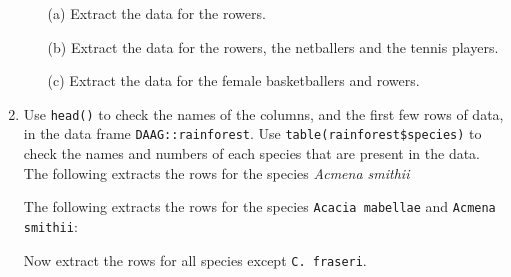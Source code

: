 \begin{enumerate}
\begin{itemize}
\item[(a)] Extract the data for the rowers.
\item[(b)] Extract the data for the rowers, the netballers and the
tennis players.
\item[(c)] Extract the data for the female basketballers and rowers.
\end{itemize}
\item Use \texttt{head()} to check the names of the columns, and the first
few rows of data, in the data frame \texttt{DAAG::rainforest}.
Use \verb!table(rainforest$species)! to check the names and numbers of
each species that are present in the data.
The following extracts the rows for the species \textit{Acmena smithii}
\begin{knitrout}
\color{fgcolor}\begin{kframe}
\begin{alltt}
 \hlkwb{<-} \hlopt{==}\hlstd{)}
\end{alltt}
\end{kframe}
\end{knitrout}
The following extracts the rows for the species \texttt{Acacia mabellae} and
\texttt{Acmena smithii}:
\begin{fullwidth}

\begin{knitrout}
\color{fgcolor}
\end{knitrout}

\end{fullwidth}
Now extract the rows for all species except \texttt{C. fraseri}.
\end{enumerate}
\cleartooddpage

